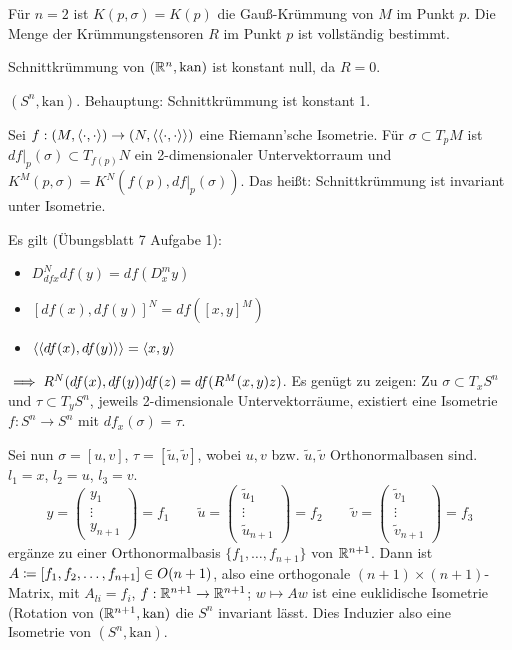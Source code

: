 \documentclass[a4paper,twoside,DIV15,BCOR12mm]{scrbook}
\newcommand{\kan}{\text{kan}}
\begin{document}
\begin{bemerkungen}
\item Für $n=2$ ist $K(p,\sigma) = K(p)$ die Gauß-Krümmung von $M$ im Punkt $p$. Die Menge der Krümmungstensoren $R$ im Punkt $p$ ist vollständig bestimmt.
\begin{beispiel}
Schnittkrümmung von $(\MdR^n,\kan)$ ist konstant null, da $R=0$.
\end{beispiel}
\item $(S^n,\kan)$. Behauptung: Schnittkrümmung ist konstant 1.
\begin{lemma}
Sei $f:(M,\langle\cdot,\cdot\rangle) \to (N,\langle\langle\cdot,\cdot\rangle\rangle)$ eine Riemann’sche Isometrie. Für $\sigma \subset T_pM$ ist $df|_p(\sigma) \subset T_{f(p)}N$ ein 2-dimensionaler Untervektorraum und $K^M(p,\sigma) = K^N(f(p),df|_p(\sigma))$. Das heißt: Schnittkrümmung ist invariant unter Isometrie.
\end{lemma}
\begin{beweis}
Es gilt (Übungsblatt 7 Aufgabe 1):
\begin{itemize}
\item $D_{dfx}^N df(y) = df(D_x^my)$
\item $[df(x), df(y)]^N = df([x,y]^M)$
\item $\langle\langle df(x),df(y)\rangle\rangle = \langle x,y\rangle$
\end{itemize}
$\implies R^N(df(x), df(y)) df(z) = df(R^M(x,y)z)$. Es genügt zu zeigen: Zu $\sigma \subset T_xS^n$ und $\tau \subset T_yS^n$, jeweils 2-dimensionale Untervektorräume, existiert eine Isometrie $f: S^n \to S^n$ mit $df_x(\sigma) = \tau$.

Sei nun $\sigma = [u,v]$, $\tau = [\tilde u, \tilde v]$, wobei $u,v$ bzw. $\tilde u, \tilde v$ Orthonormalbasen sind. $l_1=x$, $l_2=u$, $l_3=v$.
\[
y =
\begin{pmatrix}
y_1 \\ \vdots \\ y_{n+1}
\end{pmatrix}
= f_1
\qquad
\tilde u =
\begin{pmatrix}
\tilde u_1 \\ \vdots \\ \tilde u_{n+1}
\end{pmatrix}
= f_2
\qquad
\tilde v =
\begin{pmatrix}
\tilde v_1 \\ \vdots \\ \tilde v_{n+1}
\end{pmatrix}
= f_3
\]
ergänze zu einer Orthonormalbasis $\{f_1,\ldots,f_{n+1}\}$ von $\mathbb{R}^{n+1}$. Dann ist $A \da [f_1,f_2,\ldots,f_{n+1}] \in O(n+1)$, also eine orthogonale $(n+1)\times(n+1)$-Matrix, mit $A_{li} = f_i$, $f: \mathbb{R}^{n+1} \to \mathbb{R}^{n+1}$; $w\mapsto Aw$ ist eine euklidische Isometrie (Rotation von $(\MdR^{n+1},\kan)$ die $S^n$ invariant lässt. Dies Induzier also eine Isometrie von $(S^n,\kan)$.


\end{beweis}
\end{bemerkungen}
\end{document}
